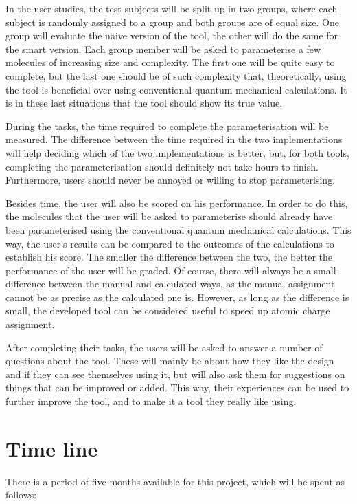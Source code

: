 In the user studies, the test subjects will be split up in two groups, where each subject is randomly assigned to a group and both groups are of equal size. One group will evaluate the naive version of the tool, the other will do the same for the smart version. Each group member will be asked to parameterise a few molecules of increasing size and complexity. The first one will be quite easy to complete, but the last one should be of such complexity that, theoretically, using the tool is beneficial over using conventional quantum mechanical calculations. It is in these last situations that the tool should show its true value.

During the tasks, the time required to complete the parameterisation will be measured. The difference between the time required in the two implementations will help deciding which of the two implementations is better, but, for both tools, completing the parameterisation should definitely not take hours to finish. Furthermore, users should never be annoyed or willing to stop parameterising.

Besides time, the user will also be scored on his performance. In order to do this, the molecules that the user will be asked to parameterise should already have been parameterised using the conventional quantum mechanical calculations. This way, the user's results can be compared to the outcomes of the calculations to establish his score. The smaller the difference between the two, the better the performance of the user will be graded. Of course, there will always be a small difference between the manual and calculated ways, as the manual assignment cannot be as precise as the calculated one is. However, as long as the difference is small, the developed tool can be considered useful to speed up atomic charge assignment.

After completing their tasks, the users will be asked to answer a number of questions about the tool. These will mainly be about how they like the design and if they can see themselves using it, but will also ask them for suggestions on things that can be improved or added. This way, their experiences can be used to further improve the tool, and to make it a tool they really like using.


\section{Time line}

There is a period of five months available for this project, which will be spent as follows:

